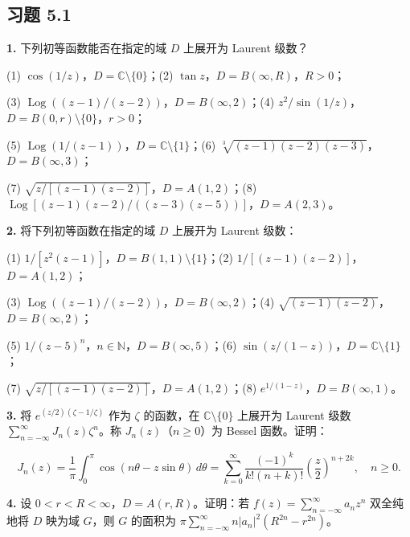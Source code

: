 \documentclass[11pt,a4paper]{article}
\begin{document}
\subsection{习题 5.1}\label{ch05-practice-heading-1}

\par{}
\noindent\textbf{1.} 下列初等函数能否在指定的域 \(D\) 上展开为 Laurent 级数？

(1) \(\cos(1/z)\)，\(D=\mathbb C\setminus\{0\}\)；(2)
\(\tan z\)，\(D=B(\infty,R)\)，\(R>0\)；

(3) \(\operatorname{Log}((z-1)/(z-2))\)，\(D=B(\infty,2)\)；(4)
\(z^2/\sin(1/z)\)，\(D=B(0,r)\setminus\{0\}\)，\(r>0\)；

(5) \(\operatorname{Log}(1/(z-1))\)，\(D=\mathbb C\setminus\{1\}\)；(6)
\(\sqrt[3]{(z-1)(z-2)(z-3)}\)，\(D=B(\infty,3)\)；

(7) \(\sqrt{z/[(z-1)(z-2)]}\)，\(D=A(1,2)\)；(8)
\(\operatorname{Log}[(z-1)(z-2)/((z-3)(z-5))]\)，\(D=A(2,3)\)。

\par{}
\noindent\textbf{2.} 将下列初等函数在指定的域 \(D\) 上展开为 Laurent 级数：

(1) \(1/[z^2(z-1)]\)，\(D=B(1,1)\setminus\{1\}\)；(2)
\(1/[(z-1)(z-2)]\)，\(D=A(1,2)\)；

(3) \(\operatorname{Log}((z-1)/(z-2))\)，\(D=B(\infty,2)\)；(4)
\(\sqrt{(z-1)(z-2)}\)，\(D=B(\infty,2)\)；

(5) \(1/(z-5)^n\)，\(n\in\mathbb N\)，\(D=B(\infty,5)\)；(6)
\(\sin(z/(1-z))\)，\(D=\mathbb C\setminus\{1\}\)；

(7) \(\sqrt{z/[(z-1)(z-2)]}\)，\(D=A(1,2)\)；(8)
\(e^{1/(1-z)}\)，\(D=B(\infty,1)\)。

\par{}
\noindent\textbf{3.} 将 \(e^{(z/2)(\zeta-1/\zeta)}\) 作为 \(\zeta\) 的函数，在
\(\mathbb C\setminus\{0\}\) 上展开为 Laurent 级数
\(\sum_{n=-\infty}^\infty J_n(z)\zeta^n\)。称 \(J_n(z)\)（\(n\ge0\)）为
Bessel 函数。证明：

\[
J_n(z)=\frac1\pi\int_0^\pi\cos(n\theta-z\sin\theta)\,d\theta
=\sum_{k=0}^\infty\frac{(-1)^k}{k!(n+k)!}\left(\frac z2\right)^{n+2k},\quad n\ge0.
\]

\par{}
\noindent\textbf{4.} 设 \(0<r<R<\infty\)，\(D=A(r,R)\)。证明：若
\(f(z)=\sum_{n=-\infty}^\infty a_nz^n\) 双全纯地将 \(D\) 映为域
\(G\)，则 \(G\) 的面积为
\(\pi\sum_{n=-\infty}^\infty n|a_n|^2(R^{2n}-r^{2n})\)。
\end{document}
